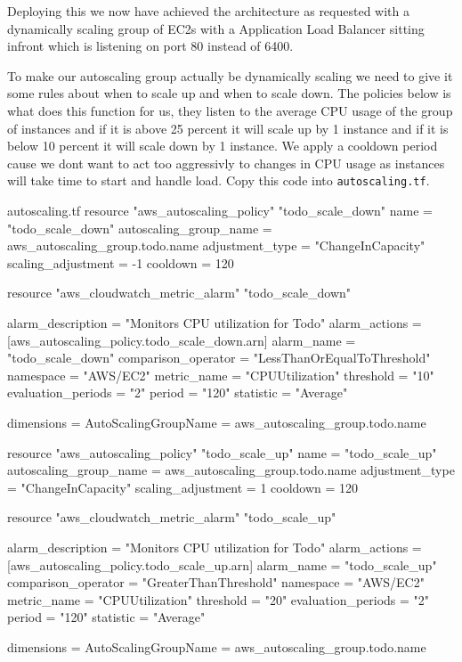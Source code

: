 \documentclass{csse4400}
\begin{document}
Deploying this we now have achieved the architecture as requested with a dynamically scaling group of EC2s with a Application Load Balancer sitting infront which is listening on port 80 instead of 6400.

To make our autoscaling group actually be dynamically scaling we need to give it some rules about when to scale up and when to scale down. The policies below is what does this function for us, they listen to the average CPU usage of the group of instances and if it is above 25 percent it will scale up by 1 instance and if it is below 10 percent it will scale down by 1 instance. We apply a cooldown period cause we dont want to act too aggressivly to changes in CPU usage as instances will take time to start and handle load. Copy this code into \texttt{autoscaling.tf}.

\begin{code}[language=terraform,numbers=none,keepspaces=true]{autoscaling.tf}
resource "aws_autoscaling_policy" "todo_scale_down" {
  name                   = "todo_scale_down"
  autoscaling_group_name = aws_autoscaling_group.todo.name
  adjustment_type        = "ChangeInCapacity"
  scaling_adjustment     = -1
  cooldown               = 120
}

resource "aws_cloudwatch_metric_alarm" "todo_scale_down" {
  alarm_description   = "Monitors CPU utilization for Todo"
  alarm_actions       = [aws_autoscaling_policy.todo_scale_down.arn]
  alarm_name          = "todo_scale_down"
  comparison_operator = "LessThanOrEqualToThreshold"
  namespace           = "AWS/EC2"
  metric_name         = "CPUUtilization"
  threshold           = "10"
  evaluation_periods  = "2"
  period              = "120"
  statistic           = "Average"

  dimensions          = {
    AutoScalingGroupName = aws_autoscaling_group.todo.name
  }
}

resource "aws_autoscaling_policy" "todo_scale_up" {
  name                   = "todo_scale_up"
  autoscaling_group_name = aws_autoscaling_group.todo.name
  adjustment_type        = "ChangeInCapacity"
  scaling_adjustment     = 1
  cooldown               = 120
}

resource "aws_cloudwatch_metric_alarm" "todo_scale_up" {
  alarm_description   = "Monitors CPU utilization for Todo"
  alarm_actions       = [aws_autoscaling_policy.todo_scale_up.arn]
  alarm_name          = "todo_scale_up"
  comparison_operator = "GreaterThanThreshold"
  namespace           = "AWS/EC2"
  metric_name         = "CPUUtilization"
  threshold           = "20"
  evaluation_periods  = "2"
  period              = "120"
  statistic           = "Average"

  dimensions          = {
    AutoScalingGroupName = aws_autoscaling_group.todo.name
  }
}
\end{code}
\end{document}
